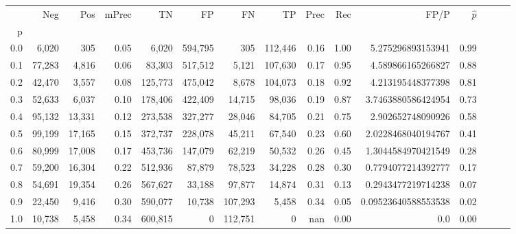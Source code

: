 \begin{tabular}{rrrrrrrrrrrrrrr}
\toprule
{} &     Neg &     Pos & mPrec &       TN &       FP &       FN &       TP &  Prec &   Rec &                 FP/P & $\hat{p}$ \\
p   &         &         &       &          &          &          &          &       &       &                      &           \\
\midrule
0.0 &   6,020 &     305 &  0.05 &    6,020 &  594,795 &      305 &  112,446 &  0.16 &  1.00 &    5.275296893153941 &      0.99 \\
0.1 &  77,283 &   4,816 &  0.06 &   83,303 &  517,512 &    5,121 &  107,630 &  0.17 &  0.95 &    4.589866165266827 &      0.88 \\
0.2 &  42,470 &   3,557 &  0.08 &  125,773 &  475,042 &    8,678 &  104,073 &  0.18 &  0.92 &    4.213195448377398 &      0.81 \\
0.3 &  52,633 &   6,037 &  0.10 &  178,406 &  422,409 &   14,715 &   98,036 &  0.19 &  0.87 &   3.7463880586424954 &      0.73 \\
0.4 &  95,132 &  13,331 &  0.12 &  273,538 &  327,277 &   28,046 &   84,705 &  0.21 &  0.75 &    2.902652748090926 &      0.58 \\
0.5 &  99,199 &  17,165 &  0.15 &  372,737 &  228,078 &   45,211 &   67,540 &  0.23 &  0.60 &   2.0228468040194767 &      0.41 \\
0.6 &  80,999 &  17,008 &  0.17 &  453,736 &  147,079 &   62,219 &   50,532 &  0.26 &  0.45 &   1.3044584970421549 &      0.28 \\
0.7 &  59,200 &  16,304 &  0.22 &  512,936 &   87,879 &   78,523 &   34,228 &  0.28 &  0.30 &   0.7794077214392777 &      0.17 \\
0.8 &  54,691 &  19,354 &  0.26 &  567,627 &   33,188 &   97,877 &   14,874 &  0.31 &  0.13 &   0.2943477219714238 &      0.07 \\
0.9 &  22,450 &   9,416 &  0.30 &  590,077 &   10,738 &  107,293 &    5,458 &  0.34 &  0.05 &  0.09523640588553538 &      0.02 \\
1.0 &  10,738 &   5,458 &  0.34 &  600,815 &        0 &  112,751 &        0 &   nan &  0.00 &                  0.0 &      0.00 \\
\bottomrule
\end{tabular}
